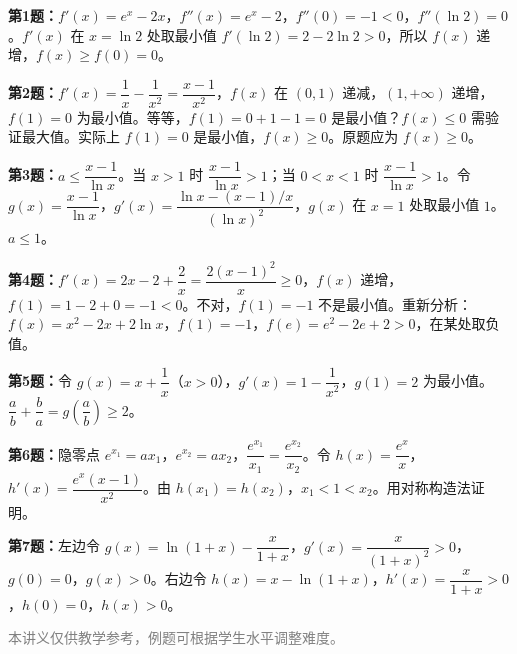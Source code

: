 \documentclass[12pt, a4paper]{ctexart}
\begin{document}
\vspace{10pt}
\begin{knowledgebox}[参考答案]
\textbf{第1题：}$f'(x)=e^x-2x$，$f''(x)=e^x-2$，$f''(0)=-1<0$，$f''(\ln 2)=0$。$f'(x)$ 在 $x=\ln 2$ 处取最小值 $f'(\ln 2)=2-2\ln 2>0$，所以 $f(x)$ 递增，$f(x)\geq f(0)=0$。

\textbf{第2题：}$f'(x)=\dfrac{1}{x}-\dfrac{1}{x^2}=\dfrac{x-1}{x^2}$，$f(x)$ 在 $(0,1)$ 递减，$(1,+\infty)$ 递增，$f(1)=0$ 为最小值。等等，$f(1)=0+1-1=0$ 是最小值？$f(x)\leq 0$ 需验证最大值。实际上 $f(1)=0$ 是最小值，$f(x)\geq 0$。原题应为 $f(x)\geq 0$。

\textbf{第3题：}$a\leq \dfrac{x-1}{\ln x}$。当 $x>1$ 时 $\dfrac{x-1}{\ln x}>1$；当 $0<x<1$ 时 $\dfrac{x-1}{\ln x}>1$。令 $g(x)=\dfrac{x-1}{\ln x}$，$g'(x)=\dfrac{\ln x-(x-1)/x}{(\ln x)^2}$，$g(x)$ 在 $x=1$ 处取最小值 $1$。$a\leq 1$。

\textbf{第4题：}$f'(x)=2x-2+\dfrac{2}{x}=\dfrac{2(x-1)^2}{x}\geq 0$，$f(x)$ 递增，$f(1)=1-2+0=-1<0$。不对，$f(1)=-1$ 不是最小值。重新分析：$f(x)=x^2-2x+2\ln x$，$f(1)=-1$，$f(e)=e^2-2e+2>0$，在某处取负值。

\textbf{第5题：}令 $g(x)=x+\dfrac{1}{x}$（$x>0$），$g'(x)=1-\dfrac{1}{x^2}$，$g(1)=2$ 为最小值。$\dfrac{a}{b}+\dfrac{b}{a}=g\left(\dfrac{a}{b}\right)\geq 2$。

\textbf{第6题：}隐零点 $e^{x_1}=ax_1$，$e^{x_2}=ax_2$，$\dfrac{e^{x_1}}{x_1}=\dfrac{e^{x_2}}{x_2}$。令 $h(x)=\dfrac{e^x}{x}$，$h'(x)=\dfrac{e^x(x-1)}{x^2}$。由 $h(x_1)=h(x_2)$，$x_1<1<x_2$。用对称构造法证明。

\textbf{第7题：}左边令 $g(x)=\ln(1+x)-\dfrac{x}{1+x}$，$g'(x)=\dfrac{x}{(1+x)^2}>0$，$g(0)=0$，$g(x)>0$。右边令 $h(x)=x-\ln(1+x)$，$h'(x)=\dfrac{x}{1+x}>0$，$h(0)=0$，$h(x)>0$。
\end{knowledgebox}

\vfill
\begin{center}
\small\textcolor{gray}{本讲义仅供教学参考，例题可根据学生水平调整难度。}
\end{center}
\end{document}
